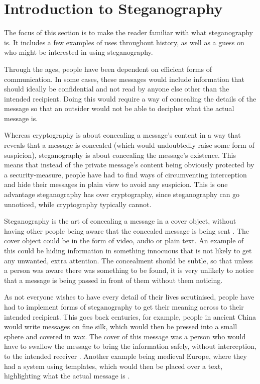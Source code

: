 \section{Introduction to Steganography}
The focus of this section is to make the reader familiar with what steganography is. It includes a few examples of uses throughout history, as well as a guess on who might be interested in using steganography.\vspace*{12pt}

\noindent Through the ages, people have been dependent on efficient forms of communication. 
In some cases, these messages would include information that should ideally be confidential and not read by anyone else other than the intended recipient.
Doing this would require a way of concealing the details of the message so that an outsider would not be able to decipher what the actual message is.

Whereas cryptography is about concealing a message's content in a way that reveals that a message is concealed (which would undoubtedly raise some form of suspicion), steganography is about concealing the message's existence.
This means that instead of the private message's content being obviously protected by a security-measure, people have had to find ways of circumventing interception and hide their messages in plain view to avoid any suspicion.
This is one advantage steganography has over cryptography, since steganography can go unnoticed, while cryptography typically cannot. 

Steganography is the art of concealing a message in a cover object, without having other people being aware that the concealed message is being sent \citep{Anderson1998}.
The cover object could be in the form of video, audio or plain text.
An example of this could be hiding information in something innocuous that is not likely to get any unwanted, extra attention.
The concealment should be subtle, so that unless a person was aware there was something to be found, it is very unlikely to notice that a message is being passed in front of them without them noticing.

As not everyone wishes to have every detail of their lives scrutinised, people have had to implement forms of steganography to get their meaning across to their intended recipient.
This goes back centuries, for example, people in ancient China would write messages on fine silk, which would then be pressed into a small sphere and covered in wax.
The cover of this message was a person who would have to swallow the message to bring the information safely, without interception, to the intended receiver \citep{Singh2001}.
Another example being medieval Europe, where they had a system using templates, which would then be placed over a text, highlighting what the actual message is \citep{Anderson1998}.

